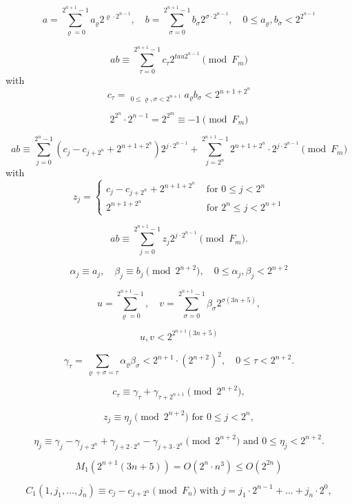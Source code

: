 \documentclass{article}
\begin{document}
\[
\tag{4.9}
a = \sum_{\varrho = 0}^{2^{n + 1} - 1} a_\varrho 2^{\varrho \cdot 2^{n - 1}}, \quad b = \sum_{\sigma = 0}^{2^{n + 1} - 1} b_\sigma 2^{\sigma \cdot 2^{n - 1}}, \quad 0 \le a_\varrho, b_\sigma < 2^{2^{n - 1}}
\]

\[
ab \equiv \sum_{\tau = 0}^{2^{n + 1} - 1} c_\tau 2^{tau 2^{n - 1}} \pmod{F_m}
\]
with
\[
\tag{4.10}
c_\tau = \mathop{\sum_{\varrho + \sigma \equiv \tau \pmod{2^{n + 1}}}}_{0 \le \varrho, \sigma < 2^{n + 1}} a_\varrho b_\sigma < 2^{n + 1 + 2^n}
\]

\[
2^{2^n} \cdot 2^{n - 1} = 2^{2^m} \equiv -1 \pmod{F_m}
\]

\[
ab \equiv \sum_{j = 0}^{2^n - 1} \left(c_j - c_{j + 2^n} + 2^{n + 1 + 2^n}\right) 2^{j \cdot 2^{n - 1}} + \sum_{j = 2^n}^{2^{n + 1} - 1} 2^{n + 1 + 2^n} \cdot 2^{j \cdot 2^{n - 1}} \pmod{F_m}
\]
with
\[
\tag{4.11}
z_j =
\begin{cases}
c_j - c_{j + 2^n} + 2^{n + 1 + 2^n} & \text{ for } 0 \le j < 2^n \\
2^{n + 1 + 2^n} & \text{ for } 2^n \le j < 2^{n + 1}
\end{cases}
\]

\[
\tag{4.12}
ab \equiv \sum_{j = 0}^{2^{n + 1} - 1} z_j 2^{j \cdot 2^{n - 1}} \pmod{F_m}.
\]

\[
\alpha_j \equiv a_j, \quad \beta_j \equiv b_j \pmod{2^{n + 2}}, \quad 0 \le \alpha_j, \beta_j < 2^{n + 2}
\]

\[
u = \sum_{\varrho = 0}^{2^{n + 1} - 1}, \quad v = \sum_{\sigma = 0}^{2^{n + 1} - 1} \beta_\sigma 2^{\sigma (3n + 5)},
\]

\[
u, v < 2^{2^{n + 1}(3n + 5)}
\]

\[
\gamma_\tau = \sum_{\varrho + \sigma = \tau} \alpha_\varrho \beta_\sigma < 2^{n + 1} \cdot \left(2^{n + 2}\right)^2, \quad 0 \le \tau < 2^{n + 2}.
\]

\[
c_\tau \equiv \gamma_\tau + \gamma_{\tau + 2^{n + 1}} \pmod{2^{n + 2}},
\]

\[
\tag{4.14}
z_j \equiv \eta_j \pmod{2^{n + 2}}\text{ for }0 \le j < 2^n,
\]

\[
\eta_j \equiv \gamma_j - \gamma_{j + 2^n} + \gamma_{j + 2 \cdot 2^n} - \gamma_{j + 3 \cdot 2^n} \pmod{2^{n + 2}}\text{ and }0 \le \eta_j < 2^{n + 2}.
\]

\[
M_1(2^{n + 1} (3n + 5)) = O(2^n \cdot n^3) \le O(2^{2n})
\]

\[
C_1(1, j_1, \ldots, j_n) \equiv c_j - c_{j + 2^n} \pmod{F_n}\text{ with }j = j_1 \cdot 2^{n - 1} + \ldots + j_n \cdot 2^0,
\]
\end{document}
